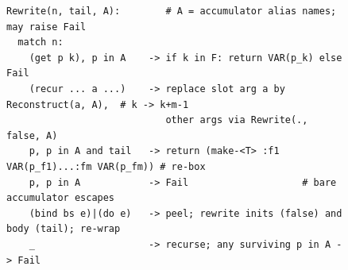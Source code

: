 \documentclass[sigplan,screen,review,anonymous]{acmart}
\begin{document}
\begin{figure}[t]
\begin{lstlisting}[language={},basicstyle=\fontsize{8pt}{9pt}\selectfont\ttfamily,numbers=none,frame=single,columns=fullflexible,keepspaces=true,keywordstyle={}]
Rewrite(n, tail, A):        # A = accumulator alias names; may raise Fail
  match n:
    (get p k), p in A    -> if k in F: return VAR(p_k) else Fail
    (recur ... a ...)    -> replace slot arg a by Reconstruct(a, A),  # k -> k+m-1
                            other args via Rewrite(., false, A)
    p, p in A and tail   -> return (make-<T> :f1 VAR(p_f1)...:fm VAR(p_fm)) # re-box
    p, p in A            -> Fail                    # bare accumulator escapes
    (bind bs e)|(do e)   -> peel; rewrite inits (false) and body (tail); re-wrap
    _                    -> recurse; any surviving p in A -> Fail


\end{lstlisting}
\end{figure}
\end{document}
